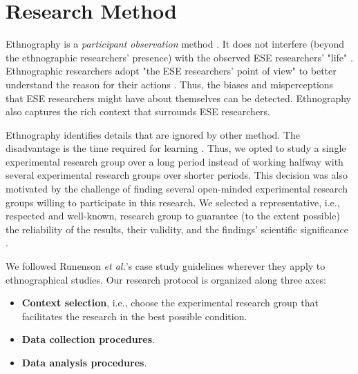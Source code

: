 \section{Research Method}\label{sec-research-method}

Ethnography is a \textit{participant observation} method . It does not interfere (beyond the ethnographic researchers' presence) with the observed ESE researchers' "life" \cite{Sharp-2016-Ethnographic-Studies-ESE}. Ethnographic researchers adopt "the ESE researchers' point of view" to better understand the reason for their actions \cite[pp. 55-56]{Outhwaite-2007-sage}. Thus, the biases and misperceptions that ESE researchers might have about themselves can be detected. Ethnography also captures the rich context that surrounds ESE researchers.

Ethnography identifies details that are ignored by  other method. The disadvantage is the time required for learning \cite{Sharp-2016-Ethnographic-Studies-ESE}. Thus, we opted to study a single experimental research group over a long period instead of working halfway with several experimental research groups over shorter periods. This decision was also motivated by the challenge of finding several open-minded experimental research groups willing to participate in this research. We selected a representative, i.e., respected and well-known, research group to guarantee (to the extent possible) the reliability of the results, their validity, and the findings' scientific significance \cite{sjoberg-2007-future-empical-methods}.

We followed Runenson \textit{et al.}'s case study guidelines \cite{Runenson-2012-case-study-SE} wherever they apply to ethnographical studies. Our research protocol is organized along three axes:

\begin{itemize}
	\item \textbf{Context selection}, i.e., choose the experimental research group that facilitates the research in the best possible condition.
    \item \textbf{Data collection procedures}.
    \item \textbf{Data analysis procedures}.
\end{itemize}

